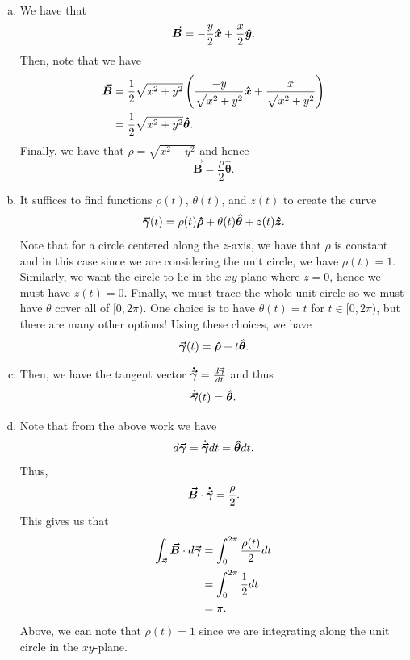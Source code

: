 \documentclass[12pt]{article} %
\newcommand{\vecfieldB}{\boldsymbol{\vec{B}}}
\newcommand{\thetahat}{\boldsymbol{\hat{\theta}}}
\newcommand{\rhohat}{\boldsymbol{\hat{\rho}}}
\begin{document}
\begin{solution}~
\begin{enumerate}[(a)]
    \item We have that
    \[
    \vecfieldB = -\frac{y}{2} \xhat + \frac{x}{2}\yhat.
    \]
    Then, note that we have
    \begin{align*}
        \vecfieldB &= \frac{1}{2}\sqrt{x^2+y^2} \left( \frac{-y}{\sqrt{x^2+y^2}} \xhat + \frac{x}{\sqrt{x^2+y^2}} \right)\\
        &=\frac{1}{2} \sqrt{x^2+y^2} \thetahat.
    \end{align*}
    Finally, we have that $\rho = \sqrt{x^2+y^2}$ and hence
    \[
    \vecfieldB = \frac{\rho}{2} \thetahat.
    \]
    \item It suffices to find functions $\rho(t)$, $\theta(t)$, and $z(t)$ to create the curve
    \[
    \curvegamma(t) = \rho(t) \rhohat + \theta(t) \thetahat + z(t) \zhat.
    \]
    Note that for a circle centered along the $z$-axis, we have that $\rho$ is constant and in this case since we are considering the unit circle, we have $\rho(t)=1$.  Similarly, we want the circle to lie in the $xy$-plane where $z=0$, hence we must have $z(t)=0$.  Finally, we must trace the whole unit circle so we must have $\theta$ cover all of $[0,2\pi)$. One choice is to have $\theta(t)=t$ for $t\in[0,2\pi)$, but there are many other options! Using these choices, we have
    \[
    \curvegamma(t) = \rhohat + t \thetahat.
    \]
    \item Then, we have the tangent vector $\boldsymbol{\dot{\vec{\gamma}}} = \frac{d\boldsymbol{\vec{\gamma}}}{dt}$ and thus
    \[
    \tangentgamma(t) = \thetahat.
    \]
    \item Note that from the above work we have
    \[
    d \curvegamma = \tangentgamma dt = \thetahat dt.
    \]
    Thus, 
    \[
    \vecfieldB \cdot \tangentgamma = \frac{\rho}{2}.
    \]
    This gives us that
    \begin{align*}
        \int_{\curvegamma} \vecfieldB \cdot d\curvegamma &= \int_0^{2\pi} \frac{\rho(t)}{2}dt\\
        &=\int_0^{2\pi} \frac{1}{2} dt\\
        &= \pi.
    \end{align*}
    Above, we can note that $\rho(t)=1$ since we are integrating along the unit circle in the $xy$-plane.
\end{enumerate}
\end{solution}
\end{document}

